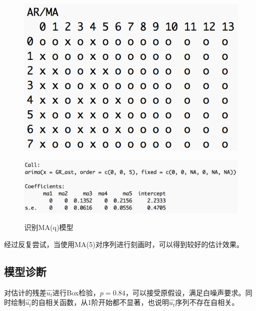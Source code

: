 \documentclass[10pt]{article}
\begin{document}
\begin{figure}[h!]
\begin{multicols}{2}
    \begin{minipage}[h]{0.5\textwidth} 
        \centering   
        \includegraphics[width=1\textwidth]{pic/eacf(gr_ast)}   
           \label{fig:apegrast:c}   
    \end{minipage}
    \begin{minipage}[h]{0.5\textwidth} 
        \centering   
        \includegraphics[width=1\textwidth]{pic/ma5}   
           \label{fig:apegrast:d}   
    \end{minipage}    
    \caption{识别MA(q)模型} \label{fig:apegrast}
\end{multicols}
\end{figure}




经过反复尝试，当使用MA(5)对序列进行刻画时，可以得到较好的估计效果。


\subsection{模型诊断}

对估计的残差$\hat{u_t}$进行Box检验，$p=0.84$，可以接受原假设，满足白噪声要求。同时绘制$\hat{u_t}$的自相关函数，从1阶开始都不显著，也说明$\hat{u_t}$序列不存在自相关。
\end{document}
